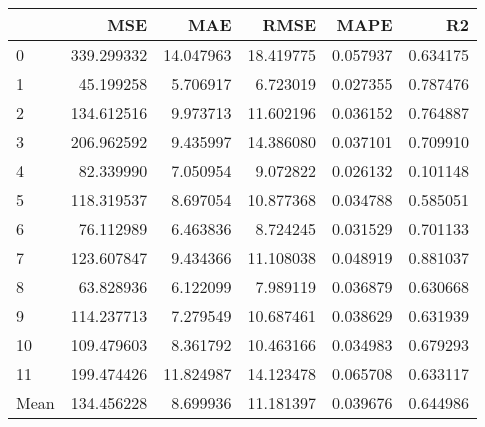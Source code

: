 \begin{tabular}{lrrrrr}
\toprule
 & MSE & MAE & RMSE & MAPE & R2 \\
\midrule
0 & 339.299332 & 14.047963 & 18.419775 & 0.057937 & 0.634175 \\
1 & 45.199258 & 5.706917 & 6.723019 & 0.027355 & 0.787476 \\
2 & 134.612516 & 9.973713 & 11.602196 & 0.036152 & 0.764887 \\
3 & 206.962592 & 9.435997 & 14.386080 & 0.037101 & 0.709910 \\
4 & 82.339990 & 7.050954 & 9.072822 & 0.026132 & 0.101148 \\
5 & 118.319537 & 8.697054 & 10.877368 & 0.034788 & 0.585051 \\
6 & 76.112989 & 6.463836 & 8.724245 & 0.031529 & 0.701133 \\
7 & 123.607847 & 9.434366 & 11.108038 & 0.048919 & 0.881037 \\
8 & 63.828936 & 6.122099 & 7.989119 & 0.036879 & 0.630668 \\
9 & 114.237713 & 7.279549 & 10.687461 & 0.038629 & 0.631939 \\
10 & 109.479603 & 8.361792 & 10.463166 & 0.034983 & 0.679293 \\
11 & 199.474426 & 11.824987 & 14.123478 & 0.065708 & 0.633117 \\
Mean & 134.456228 & 8.699936 & 11.181397 & 0.039676 & 0.644986 \\
\bottomrule
\end{tabular}
